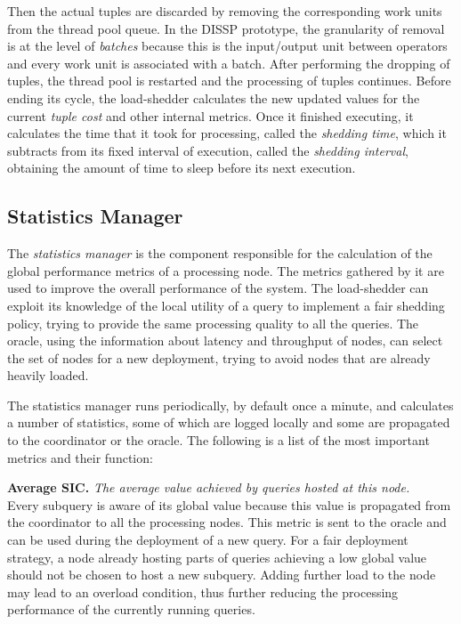 Then the actual tuples are discarded by removing the corresponding work units from the thread pool queue.
In the DISSP prototype, the granularity of removal is at the level of \emph{batches} because this is the
input/output unit between operators and every work unit is associated with a batch. After performing the
dropping of tuples, the thread pool is restarted and the processing of tuples continues. Before ending
its cycle, the load-shedder calculates the new updated values for the current \emph{tuple cost} and other
internal metrics. Once it finished executing, it calculates the time that it took for processing, called
the \emph{shedding time}, which it subtracts from its fixed interval of execution, called the
\emph{shedding interval}, obtaining the amount of time to sleep before its next execution.

\subsection*{Statistics Manager}
The \emph{statistics manager} is the component responsible for the calculation of the global performance
metrics of a processing node. The metrics gathered by it are used to improve the overall
performance of the system. The load-shedder can exploit its knowledge of the local utility of a
query to implement a fair shedding policy, trying to provide the same processing quality to
all the queries. The oracle, using the information about latency and throughput of nodes, can select the set of
nodes for a new deployment, trying to avoid nodes that are already heavily loaded.

The statistics manager runs periodically, by default once a minute, and calculates a number of
statistics, some of which are logged locally and some are propagated to the coordinator or the
oracle. The following is a list of the most important metrics and their function:

\textbf{Average SIC.} \emph{The average \sic value achieved by queries hosted at this node.}\\
Every subquery is aware of its global \sic value because this value is propagated from the coordinator to
all the processing nodes. This metric is sent to the oracle and can be used during the deployment of
a new query. For a fair deployment strategy, a node already hosting parts of queries
achieving a low global \sic value should not be chosen to host a new subquery. Adding further load
to the node may lead to an overload condition, thus further reducing the processing performance of the
currently running queries. 

